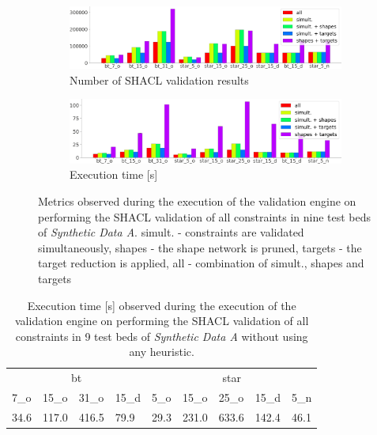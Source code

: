 \begin{figure}
        \centering
        \begin{subfigure}{\linewidth}
            \centering
            \includegraphics[width=\textwidth]{images/evaluation/ablation_study_targets.png}
            \caption{Number of SHACL validation results}
            \label{fig:number_of_shacl_validation_results}
        \end{subfigure}
        \vspace{0.3cm}
        \begin{subfigure}{\linewidth}
            \centering
    \includegraphics[width=\textwidth]{images/evaluation/ablation_study_shacl_time.png}
            \caption{Execution time [s]}
            \label{fig:average_execution_time_shacl}
        \end{subfigure} 
        \caption{Metrics observed during the execution of the validation engine on performing the SHACL validation of all constraints in nine test beds of \textit{Synthetic Data A}. simult. - constraints are validated simultaneously, shapes - the shape network is pruned, targets - the target reduction is applied, all - combination of simult., shapes and targets}
        \label{fig:metrics_ablation}
\end{figure}

\begin{table}
    \centering
    \begin{tabular}{llll|lllll}
        \toprule
        \multicolumn{4}{c|}{bt} & \multicolumn{5}{c}{star}\\
        7\_o & 15\_o & 31\_o & 15\_d & 5\_o & 15\_o & 25\_o & 15\_d & 5\_n\\
        \midrule
        \midrule
         34.6 & 117.0 & 416.5 & 79.9 & 29.3 & 231.0 & 633.6 & 142.4 & 46.1\\
        \bottomrule
    \end{tabular}
    \caption{Execution time [s] observed during the execution of the validation engine on performing the SHACL validation of all constraints in 9 test beds of \textit{Synthetic Data A} without using any heuristic.}
    \label{fig:baseline_multiple_constraints}
\end{table}


